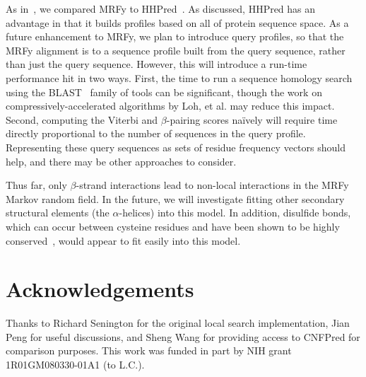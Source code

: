 \documentclass[blockstyle,times,preprint]{sigplanconf}
\begin{document}
As in~\cite{Daniels:2012dg}, we compared MRFy to 
HHPred~\cite{Soding:2005ff}.
As discussed, HHPred has an advantage in that it builds profiles based on all
of protein sequence space.
As a future enhancement to MRFy, we plan to introduce query profiles, so that
the MRFy alignment is to a sequence profile built from the query sequence,
rather than just the query sequence.
However, this will introduce a run-time performance hit in two ways.
First, the time to run a sequence homology search using the BLAST~\cite{Altschul:1997tl} 
family of tools can be significant, though the work on 
compressively-accelerated algorithms by Loh, et al.\cite{Loh:2012br} may reduce this 
impact.
Second, computing the Viterbi and $\beta$-pairing scores na\"{i}vely will
require time directly proportional to the number of sequences in the query
profile.
Representing these query sequences as sets of residue frequency vectors should
help, and there may be other approaches to consider.

Thus far, only $\beta$-strand interactions lead to non-local interactions in the
MRFy Markov random field.
In the future, we will investigate fitting other secondary structural elements
(the $\alpha$-helices) into this model.
In addition, disulfide bonds, which can occur between cysteine residues and
have been shown to be highly conserved~\cite{Naamati:2009eg, Tirosh:2012iq}, 
would appear to fit easily into this model.

\section{Acknowledgements}
Thanks to Richard Senington for the original local search implementation, Jian
Peng for useful discussions, and
Sheng Wang for providing access to CNFPred for comparison purposes.
This work was funded in part by NIH grant 1R01GM080330-01A1 (to L.C.).



{\small 

  }
\end{document}
